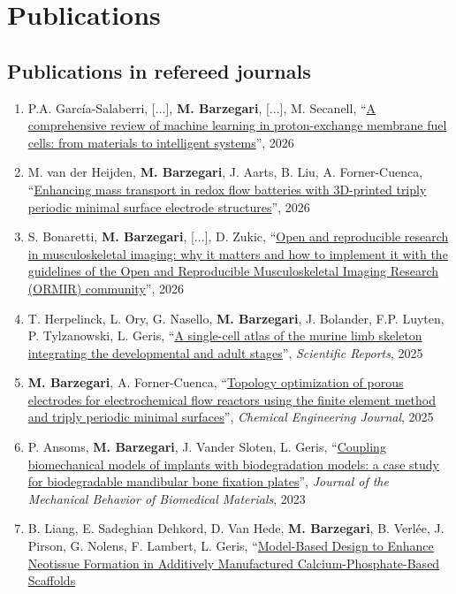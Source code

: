 \documentclass{cv}
\begin{document}
\section{Publications}

\subsection{Publications in refereed journals}
\begin{enumerate}[itemsep=-0.2ex]
\item
P.A. García-Salaberri, [...], \textbf{M. Barzegari}, [...], M. Secanell, ``\href{https://doi.org/10.1016/j.apenergy.2026.128915}{A comprehensive review of machine learning in proton-exchange membrane fuel cells: from materials to intelligent systems}'', 2026 
\item
M. van der Heijden, \textbf{M. Barzegari}, J. Aarts, B. Liu, A. Forner-Cuenca, ``\href{https://doi.org/10.1016/j.est.2026.123821}{Enhancing mass transport in redox flow batteries with 3D-printed triply periodic minimal surface electrode structures}'', 2026
\item
S. Bonaretti, \textbf{M. Barzegari}, [...], D. Zukic, ``\href{https://doi.org/10.1093/jbmrpl/ziag025}{Open and reproducible research in musculoskeletal imaging: why it matters and how to implement it with the guidelines of the Open and Reproducible Musculoskeletal Imaging Research (ORMIR) community}'', 2026 
\item
T. Herpelinck, L. Ory, G. Nasello, \textbf{M. Barzegari}, J. Bolander, F.P. Luyten, P. Tylzanowski, L. Geris, ``\href{https://doi.org/10.1038/s41598-025-05277-6}{A single-cell atlas of the murine limb skeleton integrating the developmental and adult stages}'', \textit{Scientific Reports}, 2025 
\item
\textbf{M. Barzegari}, A. Forner-Cuenca, ``\href{https://doi.org/10.1016/j.cej.2025.161815}{Topology optimization of porous electrodes for electrochemical flow reactors using the finite element method and triply periodic minimal surfaces}'', \textit{Chemical Engineering Journal}, 2025
\item
P. Ansoms, \textbf{M. Barzegari}, J. Vander Sloten, L. Geris, ``\href{https://doi.org/10.1016/j.jmbbm.2023.106120}{Coupling biomechanical models of implants with biodegradation models: a case study for biodegradable mandibular bone fixation plates}'', \textit{Journal of the Mechanical Behavior of Biomedical Materials}, 2023
\item
B. Liang, E. Sadeghian Dehkord, D. Van Hede, \textbf{M. Barzegari}, B. Verlée, J. Pirson, G. Nolens, F. Lambert, L. Geris, ``\href{https://doi.org/10.3390/jfb14120563}{Model-Based Design to Enhance Neotissue Formation in Additively Manufactured Calcium-Phosphate-Based Scaffolds
}
\end{enumerate}
\end{document}
